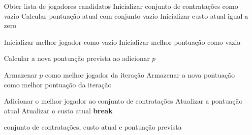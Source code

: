 \begin{algorithm}[H]
\caption{Algoritmo Guloso com estratégia Best Improvement}
\label{alg:guloso_best}
\begin{algorithmic}

\State Obter lista de jogadores candidatos
\State Inicializar conjunto de contratações como vazio
\State Calcular pontuação atual com conjunto vazio
\State Inicializar custo atual igual a zero

    \State Inicializar melhor jogador como vazio
    \State Inicializar melhor pontuação como vazia

            \State Calcular a nova pontuação prevista ao adicionar $p$

                \State Armazenar $p$ como melhor jogador da iteração
                \State Armazenar a nova pontuação como melhor pontuação da iteração
            \EndIf
        \EndIf
    \EndFor

        \State Adicionar o melhor jogador ao conjunto de contratações
        \State Atualizar a pontuação atual
        \State Atualizar o custo atual
    \Else
        \State \textbf{break}
    \EndIf
\EndWhile

\State \Return conjunto de contratações, custo atual e pontuação prevista

\end{algorithmic}
\end{algorithm}